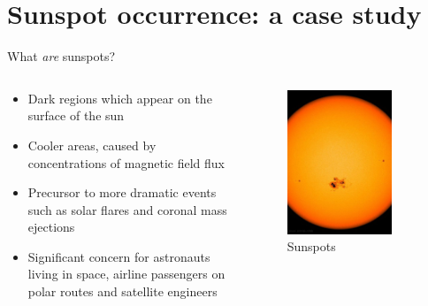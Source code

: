 \documentclass[aspectratio=169]{beamer}
\begin{document}
\section{Sunspot occurrence: a case study}

\begin{frame}{What \emph{are} sunspots?}
  \begin{columns}
    \begin{column}{0.6\textwidth}
      \begin{itemize}
        \item Dark regions which appear on the surface of the sun
        \item Cooler areas, caused by concentrations of magnetic field flux
        \item Precursor to more dramatic events such as solar flares and
          coronal mass ejections
        \item Significant concern for astronauts living in space, airline
          passengers on polar routes and satellite engineers
      \end{itemize}
    \end{column}%
    \begin{column}{0.4\textwidth}
      \begin{figure}
        \includegraphics[width=0.8\textwidth]{sun.jpg}	
        \caption{Sunspots}
      \end{figure}
    \end{column}
  \end{columns}
\end{frame}
\end{document}
